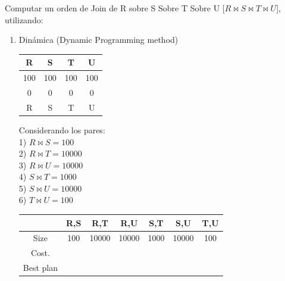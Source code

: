 \documentclass{templateNote}
\begin{document}
\begin{enumerate}
        \noindent Computar un orden de Join de R sobre S Sobre T Sobre U [$R \Join S \Join T \Join U$], utilizando:

        \begin{enumerate}[label=\alph*)]
            \item Dinámica (Dynamic Programming method) \\
            
                \begin{center}
                    \begin{tabular}{|c|c|c|c|}
                        \hline
                        R & S & T & U \\
                        \hline
                        100 & 100 & 100 & 100 \\
                        \hline
                        0 & 0 & 0 & 0 \\
                        \hline
                        R & S & T & U \\
                        \hline
                    \end{tabular}
                \end{center}

                Considerando los pares: \\

                1) $R \Join S = 100$ \\
                2) $R \Join T = 10000$ \\
                3) $R \Join U = 10000$ \\
                4) $S \Join T = 1000$ \\
                5) $S \Join U = 10000$ \\
                6) $T \Join U = 100$ \\

                \begin{center}
                    \begin{tabular}{|c|c|c|c|c|c|c|}
                        \hline
                        & R,S & R,T & R,U & S,T & S,U & T,U\\
                        \hline
                        Size & 100 & 10000 & 10000 & 1000 & 10000 & 100 \\
                        \hline
                        Cost. & & & & & &  \\
                        \hline
                        Best plan & & & & & &  \\
                        \hline
                    \end{tabular}
                \end{center}
                

\end{enumerate}
\end{enumerate}
\end{document}
